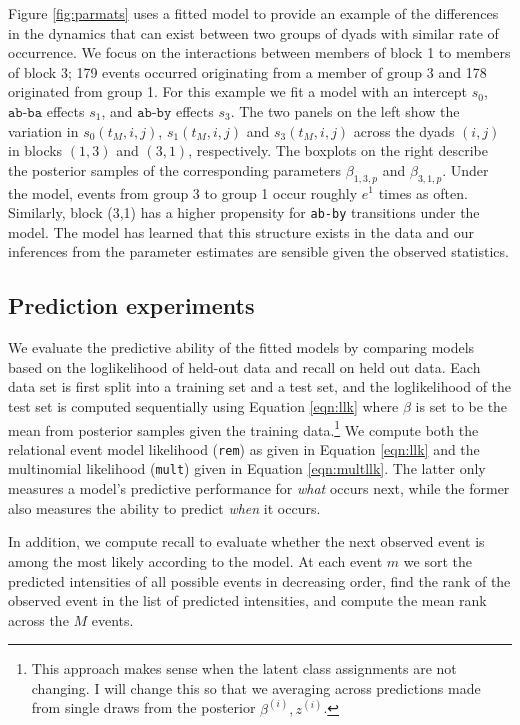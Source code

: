 Figure \ref{fig:parmats} uses a fitted model to provide an example of the differences in the dynamics that can exist between two groups of dyads with similar rate of occurrence.
We focus on the interactions between members of block 1 to members of block 3; 179 events occurred originating from a member of group 3 and 178 originated from group 1.
For this example we fit a model with an intercept $s_0$, $\texttt{ab-ba}$ effects $s_1$, and $\texttt{ab-by}$ effects $s_3$.
The two panels on the left show the variation in $s_0(t_M,i,j)$, $s_1(t_M,i,j)$ and $s_3(t_M,i,j)$ across the dyads $(i,j)$ in blocks $(1,3)$ and $(3,1)$, respectively.
The boxplots on the right describe the posterior samples of the corresponding parameters $\beta_{1,3,p}$ and $\beta_{3,1,p}$.
Under the model, events from group 3 to group 1 occur roughly $e^1$ times as often.
Similarly, block (3,1) has a higher propensity for \texttt{ab-by} transitions under the model.
The model has learned that this structure exists in the data and our inferences from the parameter estimates are sensible given the observed statistics.

\subsection{Prediction experiments}

We evaluate the predictive ability of the fitted models by comparing models based on the loglikelihood of held-out data and recall on held out data.
Each data set is first split into a training set and a test set, and the loglikelihood of the test set is computed sequentially using Equation \ref{eqn:llk} where $\beta$ is set to be the mean from posterior samples given the training data.\footnote{This approach makes sense when the latent class assignments are not changing.  I will change this so that we averaging across predictions made from single draws from the posterior $\beta^{(i)}, z^{(i)}$.}
We compute both the relational event model likelihood  (\texttt{rem}) as given in Equation \ref{eqn:llk}  and the multinomial likelihood (\texttt{mult}) given in Equation \ref{eqn:multllk}.
The latter only measures a model's predictive performance for \emph{what} occurs next, while the former also measures the ability to predict \emph{when} it occurs.

In addition, we compute recall to evaluate whether the next observed event is among the most likely according to the model.
At each event $m$ we sort the predicted intensities of all possible events in decreasing order, find the rank of the observed event in the list of predicted intensities, and compute the mean rank across the $M$ events.

